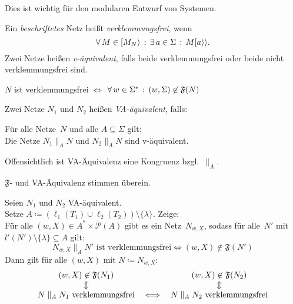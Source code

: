 \documentclass{cheat-sheet}
\newcommand{\activeTransition}[1]{[{#1}\rangle} %
\newcommand{\labelledTransition}[1]{[{#1}\rangle\rangle} %
\newcommand{\Failure}{\mathfrak{F}} %
\newcommand{\parallelComposition}{\parallel} %
\newcommand{\Powerset}{\mathcal{P}} %
\begin{document}
\begin{bem}
  Dies ist wichtig für den modularen Entwurf von Systemen.
\end{bem}

\begin{defn}
  Ein \textit{beschriftetes} Netz heißt \emph{verklemmungsfrei}, wenn
  \[
    \fa{M \in \activeTransition{M_N}} \ex{a \in \Sigma} M \labelledTransition{a}.
  \]
  Zwei Netze heißen \emph{v-äquivalent}, falls beide verklemmungsfrei oder beide nicht verklemmungsfrei sind.
\end{defn}

\begin{lem}
  $N$ ist verklemmungsfrei $\iff$ $\fa{w \in \Sigma^*} (w, \Sigma) \not\in \Failure(N)$
\end{lem}

\begin{defn}
  Zwei Netze $N_1$ und $N_2$ heißen \emph{VA-äquivalent}, falls: \\[0.4em]
  \hfill\begin{minipage}{0.95 \linewidth}
    Für alle Netze~$N$ und alle $A \subseteq \Sigma$ gilt: \\
    Die Netze $N_1 \parallelComposition_A N$ und $N_2 \parallelComposition_A N$ sind v-äquivalent.
  \end{minipage}
\end{defn}

\begin{bem}
  Offensichtlich ist VA-Äquivalenz eine Kongruenz bzgl.~$\parallelComposition_A$.
\end{bem}

\begin{satz}
  $\Failure$- und VA-Äquivalenz stimmen überein.
\end{satz}

\begin{beweisidee}
  Seien $N_1$ und $N_2$ VA-äquivalent. \\
  Setze $A \coloneqq (\ell_1(T_1) \cup \ell_2(T_2)) \setminus \{ \lambda \}$.
  Zeige: \\
  Für alle $(w, X) \in A^* \times \Powerset(A)$ gibt es ein Netz~$N_{w,X}$, sodass für alle~$N'$ mit $l'(N') \setminus \{ \lambda \} \subseteq A$ gilt:
  \[
    N_{w,X} \parallelComposition_A N' \text{ ist verklemmungsfrei} \iff (w, X) \not\in \Failure(N')
  \]
  Dann gilt für alle $(w, X)$ mit $N \coloneqq N_{w,X}$:
  \[
    \begin{array}{c c c}
      (w, X) \not\in \Failure(N_1)
      && 
      (w, X) \not\in \Failure(N_2) \\
      \Updownarrow && \Updownarrow \\
      N \parallelComposition_A N_1 \text{ verklemmungsfrei}
      & \iff &
      N \parallelComposition_A N_2 \text{ verklemmungsfrei}
    \end{array}
  \]
  \begin{align*}
  \end{align*}
\end{beweisidee}
\end{document}
